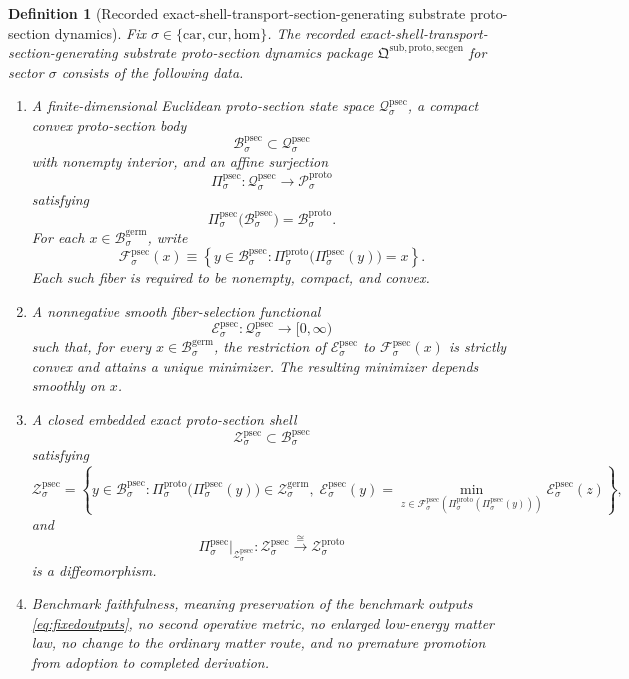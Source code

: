 \documentclass[11pt]{article}
\newcommand{\Car}{\mathrm{car}}
\newcommand{\Cur}{\mathrm{cur}}
\newcommand{\Hom}{\mathrm{hom}}
\newcommand{\GermBody}[1]{\mathcal B_{#1}^{\mathrm{germ}}}
\newcommand{\GermShell}[1]{\mathcal Z_{#1}^{\mathrm{germ}}}
\newcommand{\ProtoState}[1]{\mathcal P_{#1}^{\mathrm{proto}}}
\newcommand{\ProtoBody}[1]{\mathcal B_{#1}^{\mathrm{proto}}}
\newcommand{\ProtoProj}[1]{\Pi_{#1}^{\mathrm{proto}}}
\newcommand{\ProtoShell}[1]{\mathcal Z_{#1}^{\mathrm{proto}}}
\newcommand{\ProtoSectionPackage}{\mathfrak Q^{\mathrm{sub,proto,secgen}}}
\newcommand{\ProtoSectionState}[1]{\mathcal Q_{#1}^{\mathrm{psec}}}
\newcommand{\ProtoSectionBody}[1]{\mathcal B_{#1}^{\mathrm{psec}}}
\newcommand{\ProtoSectionProj}[1]{\Pi_{#1}^{\mathrm{psec}}}
\newcommand{\ProtoSectionFiber}[2]{\mathcal F_{#1}^{\mathrm{psec}}(#2)}
\newcommand{\ProtoSectionFunctional}[1]{\mathscr E_{#1}^{\mathrm{psec}}}
\newcommand{\ProtoSectionShell}[1]{\mathcal Z_{#1}^{\mathrm{psec}}}
\newtheorem{definition}{Definition}
\begin{document}
\begin{definition}[Recorded exact-shell-transport-section-generating substrate proto-section dynamics]
\label{def:protosection}
Fix \(\sigma\in\{\Car,\Cur,\Hom\}\). The recorded exact-shell-transport-section-generating substrate proto-section dynamics package \(\ProtoSectionPackage\) for sector \(\sigma\) consists of the following data.
\begin{enumerate}
    \item A finite-dimensional Euclidean proto-section state space \(\ProtoSectionState{\sigma}\), a compact convex proto-section body
    \[
    \ProtoSectionBody{\sigma}\subset\ProtoSectionState{\sigma}
    \]
    with nonempty interior, and an affine surjection
    \[
    \ProtoSectionProj{\sigma}:\ProtoSectionState{\sigma}\to\ProtoState{\sigma}
    \]
    satisfying
    \[
    \ProtoSectionProj{\sigma}\bigl(\ProtoSectionBody{\sigma}\bigr)=\ProtoBody{\sigma}.
    \]
    For each \(x\in\GermBody{\sigma}\), write
    \[
    \ProtoSectionFiber{\sigma}{x}
    \equiv
    \left\{
    y\in\ProtoSectionBody{\sigma}:
    \ProtoProj{\sigma}\bigl(\ProtoSectionProj{\sigma}(y)\bigr)=x
    \right\}.
    \]
    Each such fiber is required to be nonempty, compact, and convex.
    \item A nonnegative smooth fiber-selection functional
    \[
    \ProtoSectionFunctional{\sigma}:\ProtoSectionState{\sigma}\to[0,\infty)
    \]
    such that, for every \(x\in\GermBody{\sigma}\), the restriction of \(\ProtoSectionFunctional{\sigma}\) to \(\ProtoSectionFiber{\sigma}{x}\) is strictly convex and attains a unique minimizer. The resulting minimizer depends smoothly on \(x\).
    \item A closed embedded exact proto-section shell
    \[
    \ProtoSectionShell{\sigma}\subset\ProtoSectionBody{\sigma}
    \]
    satisfying
    \[
    \ProtoSectionShell{\sigma}
    =
    \left\{
    y\in\ProtoSectionBody{\sigma}:
    \ProtoProj{\sigma}\bigl(\ProtoSectionProj{\sigma}(y)\bigr)\in\GermShell{\sigma},
    \;
    \ProtoSectionFunctional{\sigma}(y)
    =
    \min_{z\in\ProtoSectionFiber{\sigma}{\ProtoProj{\sigma}(\ProtoSectionProj{\sigma}(y))}}
    \ProtoSectionFunctional{\sigma}(z)
    \right\},
    \]
    and
    \[
    \ProtoSectionProj{\sigma}\big|_{\ProtoSectionShell{\sigma}}
    :
    \ProtoSectionShell{\sigma}
    \xrightarrow{\cong}
    \ProtoShell{\sigma}
    \]
    is a diffeomorphism.
    \item Benchmark faithfulness, meaning preservation of the benchmark outputs \eqref{eq:fixedoutputs}, no second operative metric, no enlarged low-energy matter law, no change to the ordinary matter route, and no premature promotion from adoption to completed derivation.
\end{enumerate}
\end{definition}
\end{document}
